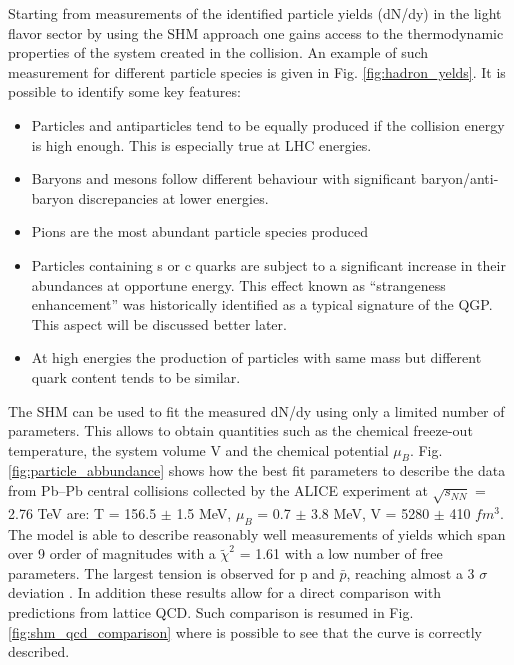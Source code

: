 \documentclass[12pt,a4paper]{book}
\begin{document}
	Starting from measurements of the identified particle yields (dN/dy) in the light flavor sector by using the SHM approach one gains access to the thermodynamic properties of the system created in the collision. An example of such measurement for different particle species is given in Fig. \ref{fig:hadron_yelds}. It is possible to identify some key features:
	\begin{itemize}
		\item  Particles and antiparticles tend to be equally produced if the collision energy is high enough. This is especially true at LHC energies.
		\item Baryons and mesons follow different behaviour with significant baryon/anti-baryon discrepancies at lower energies.
		\item  Pions are the most abundant particle species produced
		\item Particles containing s or c quarks are subject to a significant increase in their abundances at opportune energy. This effect known as “strangeness enhancement” was historically identified as a typical signature of the QGP. This aspect will be discussed better later.
		\item At high energies the production of particles with same mass but different quark content tends to be similar.
	\end{itemize}
	
	
	The SHM can be used to fit the measured dN/dy using only a limited number of parameters. This allows to obtain quantities such as the chemical freeze-out temperature, the system volume V and the chemical potential $\mu_B$. Fig. \ref{fig:particle_abbundance} shows how the best fit parameters to describe the data from Pb–Pb central collisions collected by the ALICE experiment at $\sqrt{s_{NN}}$ = 2.76 TeV are: T = 156.5 $\pm$ 1.5 MeV, $\mu_B$ = 0.7 $\pm$ 3.8 MeV, V = 5280 $\pm$ 410 $fm^3$. The model is able to describe reasonably well measurements of yields which span over 9 order of magnitudes with a $\tilde{\chi}^2$ = 1.61 with a low number of free parameters. The largest tension is observed for p and $\bar{p}$, reaching almost a 3 $\sigma$ deviation \cite{Andronic_2017}. In addition these results allow for a direct comparison with predictions from lattice QCD. Such comparison is resumed in Fig. \ref{fig:shm_qcd_comparison} where is possible to see that the curve is correctly described.
	
\end{document}
